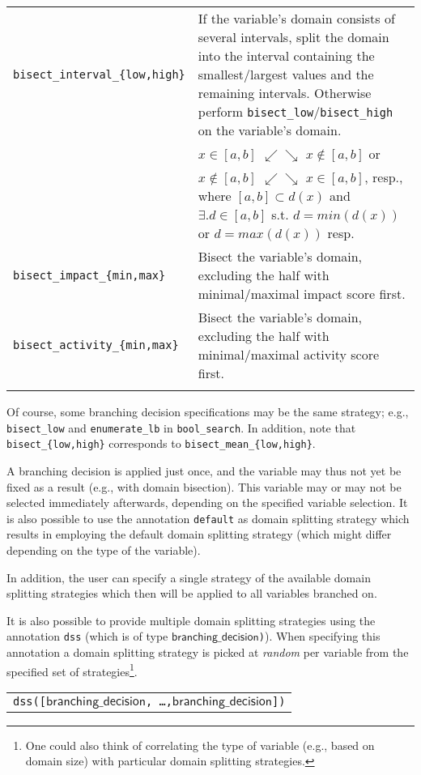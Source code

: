 \documentclass[a4paper]{article}
\newcommand{\fz}[1]{\texttt{#1}}
\newcommand{\fzsf}[1]{\ensuremath{\mathsf{#1}}}
\newcommand{\fznassignmentannotation}{\fzsf{branching\_decision}}
\begin{document}
\begin{tabular}{p{.35\linewidth}p{.6\linewidth}}
\fz{bisect\_interval\_\{low,high\}}
& If the variable's domain consists of several intervals,
split the domain into the interval containing the smallest/largest values
and the remaining intervals.
Otherwise perform \fz{bisect\_low}/\fz{bisect\_high} on the variable's domain.\\
& $x \in [a,b]$ $\swarrow\searrow$ $x \not\in [a,b]$ or\\
& $x \not\in [a,b]$ $\swarrow\searrow$ $x \in [a,b]$, resp.,
  where $[a,b] \subset d(x)$ and $\exists.d\in[a,b]$ s.t. $d=min(d(x))$ or  $d=max(d(x))$ resp.\\

\fz{bisect\_impact\_\{min,max\}}
& Bisect the variable's domain, excluding the half with minimal/maximal impact score first.\\

\fz{bisect\_activity\_\{min,max\}}
& Bisect the variable's domain, excluding the half with minimal/maximal activity score first.\\
&
\end{tabular}

Of course, some branching decision specifications may be the same strategy;
e.g., \fz{bisect\_low} and \fz{enumerate\_lb} in \fz{bool\_search}. In addition,
note that \fz{bisect\_\{low,high\}} corresponds to \fz{bisect\_mean\_\{low,high\}}.

A branching decision is applied just once, and the variable may thus not yet be
fixed as a result (e.g.,  with domain bisection).  This variable may or may not
be selected immediately afterwards, depending on the specified variable
selection. It is also possible to use the annotation \texttt{default}
as domain splitting strategy which results in employing the default 
domain splitting strategy (which might differ depending on the type of the variable).

In addition, the user can specify a single strategy of the available domain
splitting strategies which then will be applied to all variables branched on.

It is also possible to provide multiple domain splitting strategies using the
annotation \texttt{dss} (which is of type \fz{\fznassignmentannotation)}).
When specifying this annotation a domain splitting strategy is picked at
\emph{random} per variable from the specified set of strategies\footnote{One
could also think of correlating the type of variable (e.g., based on domain
size) with particular domain splitting strategies.}.

\begin{tabular}{l}
\fz{dss([\fznassignmentannotation, \ldots,\fznassignmentannotation])}
\end{tabular}
\end{document}
